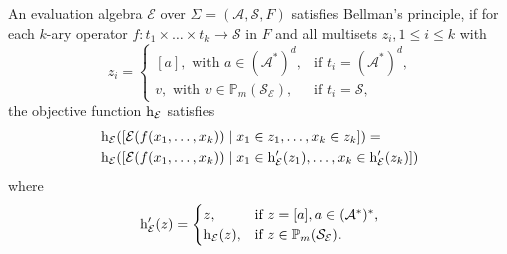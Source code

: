 \documentclass[
    a4paper,
    12pt,
    twoside,
    BCOR=12mm,
    parskip=half,
    chapterprefix,
    numbers=noenddot,
    bibliography=totoc
]{scrbook}
\begin{document}
\begin{definition}
	An evaluation algebra $\mathcal{E}$ over $\Sigma=(\mathcal{A},\mathcal{S},F)$ satisfies Bellman's principle, if for each $k$-ary operator $f : t_1 \times \ldots \times t_k \to \mathcal{S}$ in $F$ and all multisets $z_i, 1 \leq i \leq k$ with 
	\begin{equation*}
		z_i=\begin{cases}
			[a], \text{ with } a \in (\mathcal{A}^*)^d,  & \text{if $t_i=(\mathcal{A}^*)^d$,}\\
			v, \text{ with } v \in \mathbb{P}_m(\mathcal{S}_\mathcal{E}),    & \text{if $t_i=\mathcal{S}$,}
		\end{cases}
	\end{equation*}
	the objective function $\mathrm{h}_\mathcal{E}$ satisfies
	\begin{equation*}
		\begin{aligned}
			& \mathrm{h}_\mathcal{E} ( [ \mathcal{E}(f(x_1,\ldots,x_k)) \mid x_1 \in z_1,\ldots,x_k \in z_k] ) =\\
			& \mathrm{h}_\mathcal{E} ( [ \mathcal{E}(f(x_1,\ldots,x_k)) \mid x_1 \in \mathrm{h}'_\mathcal{E}(z_1),\ldots, x_k \in \mathrm{h}'_\mathcal{E}(z_k)] )
		\end{aligned}
	\end{equation*}
	where
	\begin{equation*}
		\mathrm{h}'_\mathcal{E}(z)=\begin{cases}
			z,  & \text{if $z=[a], a \in (\mathcal{A}^*)^*$,}\\
			\mathrm{h}_\mathcal{E}(z), & \text{if $z \in \mathbb{P}_m(\mathcal{S}_\mathcal{E})$.}
		\end{cases}
	\end{equation*}
\end{definition}
\end{document}
